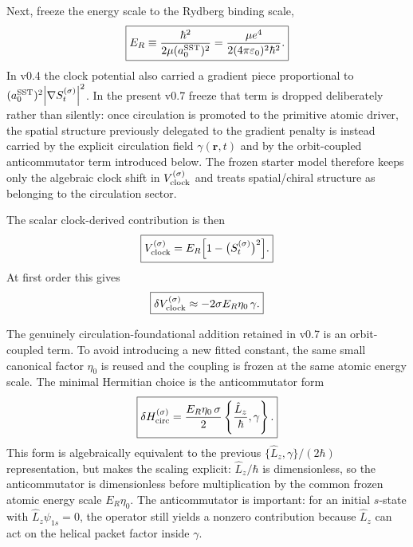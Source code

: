 \documentclass[11pt,a4paper]{article}
\begin{document}
Next, freeze the energy scale to the Rydberg binding scale,
\begin{equation}
\label{eq:ERfreeze}
\boxed{
E_R \equiv \frac{\hbar^2}{2\mu (a_0^{\rm SST})^2}
= \frac{\mu e^4}{2(4\pi\varepsilon_0)^2\hbar^2}.
}
\end{equation}
In v0.4 the clock potential also carried a gradient piece proportional to $(a_0^{\rm SST})^2\abs{\nabla S_t^{(\sigma)}}^2$. In the present v0.7 freeze that term is dropped deliberately rather than silently: once circulation is promoted to the primitive atomic driver, the spatial structure previously delegated to the gradient penalty is instead carried by the explicit circulation field $\gamma(\mathbf r,t)$ and by the orbit-coupled anticommutator term introduced below. The frozen starter model therefore keeps only the algebraic clock shift in $V_{\rm clock}^{(\sigma)}$ and treats spatial/chiral structure as belonging to the circulation sector.

The scalar clock-derived contribution is then
\begin{equation}
\label{eq:Vclock}
\boxed{
V_{\rm clock}^{(\sigma)}
=
E_R\Bigl[1-\bigl(S_t^{(\sigma)}\bigr)^2\Bigr].
}
\end{equation}
At first order this gives
\begin{equation}
\label{eq:Vclock-linear}
\boxed{
\delta V_{\rm clock}^{(\sigma)}
\approx
-2\sigma E_R\eta_0\,\gamma.
}
\end{equation}

The genuinely circulation-foundational addition retained in v0.7 is an orbit-coupled term. To avoid introducing a new fitted constant, the same small canonical factor $\eta_0$ is reused and the coupling is frozen at the same atomic energy scale. The minimal Hermitian choice is the anticommutator form
\begin{equation}
\label{eq:HintCirc}
\boxed{
\delta H_{\rm circ}^{(\sigma)}
=
\frac{E_R\eta_0\,\sigma}{2}
\left\{\frac{\hat L_z}{\hbar},\gamma\right\}.
}
\end{equation}
This form is algebraically equivalent to the previous $\{\hat L_z,\gamma\}/(2\hbar)$ representation, but makes the scaling explicit: $\hat L_z/\hbar$ is dimensionless, so the anticommutator is dimensionless before multiplication by the common frozen atomic energy scale $E_R\eta_0$. The anticommutator is important: for an initial $s$-state with $\hat L_z\psi_{1s}=0$, the operator still yields a nonzero contribution because $\hat L_z$ can act on the helical packet factor inside $\gamma$.
\end{document}
